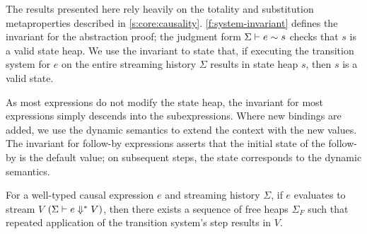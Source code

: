 The results presented here rely heavily on the totality and substitution metaproperties described in \autoref{s:core:causality}.
\autoref{f:system-invariant} defines the invariant for the abstraction proof; the judgment form $\Sigma \vdash e \sim s$ checks that $s$ is a valid state heap.
We use the invariant to state that, if executing the transition system for $e$ on the entire streaming history $\Sigma$ results in state heap $s$, then $s$ is a valid state.

As most expressions do not modify the state heap, the invariant for most expressions simply descends into the subexpressions.
Where new bindings are added, we use the dynamic semantics to extend the context with the new values.
The invariant for follow-by expressions asserts that the initial state of the follow-by is the default value; on subsequent steps, the state corresponds to the dynamic semantics.

\begin{theorem}
  For a well-typed causal expression $e$ and streaming history $\Sigma$, if $e$ evaluates to stream $V$ $(\Sigma \vdash e \Downarrow^{*} V)$, then there exists a sequence of free heaps $\Sigma_{F}$ such that repeated application of the transition system's step results in $V$.
\end{theorem}

